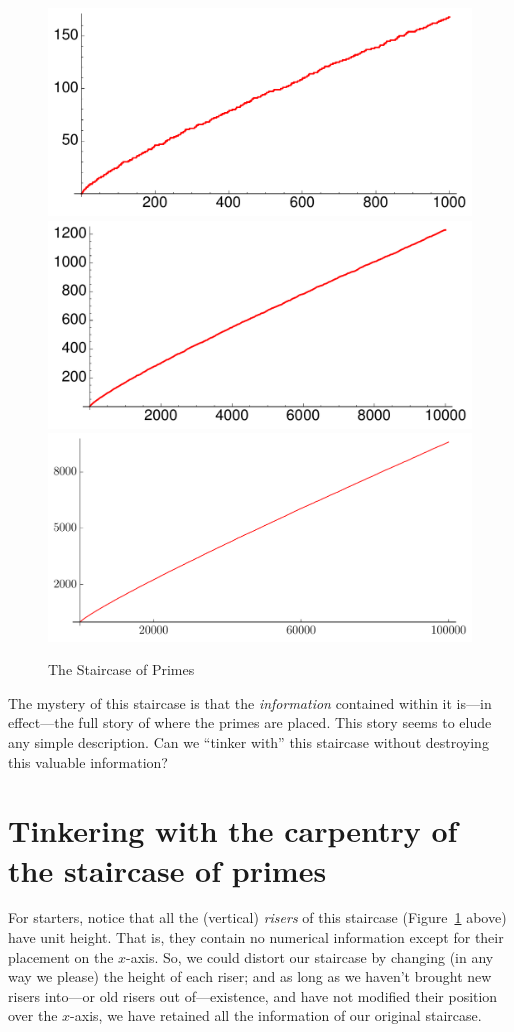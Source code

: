\documentclass[openany]{book}
\theoremstyle{plain}
\theoremstyle{definition}
\begin{document}
{\begin{figure}[H]
\includegraphics[width=.4\textwidth]{illustrations/PN_1000}
\includegraphics[width=.4\textwidth]{illustrations/PN_10000}\\

\includegraphics[width=.8\textwidth]{illustrations/PN_100000}


\caption{The Staircase of Primes\label{fig:staircases}}
\end{figure}

The mystery of this staircase is that the {\em information} contained
within it is---in effect---the full story of where the primes are
placed. This story seems to elude any simple description.  Can we
``tinker with'' this staircase without destroying this valuable
information?




\chapter[Tinkering with the staircase of primes]{Tinkering with the carpentry of the staircase of primes\label{sec:tinkering}}


For starters, notice that all the (vertical) {\em risers} of this staircase (Figure~\ref{fig:staircases} above) have
unit height. That is, they contain no numerical information except for
their placement on the $x$-axis. So, we could distort our staircase by
changing (in any way we please) the height of each riser; and as long
as we haven't brought new risers into---or old risers out
of---existence, and have not modified their position over the
$x$-axis, we have retained all the information of our original
staircase.


}
\end{document}
